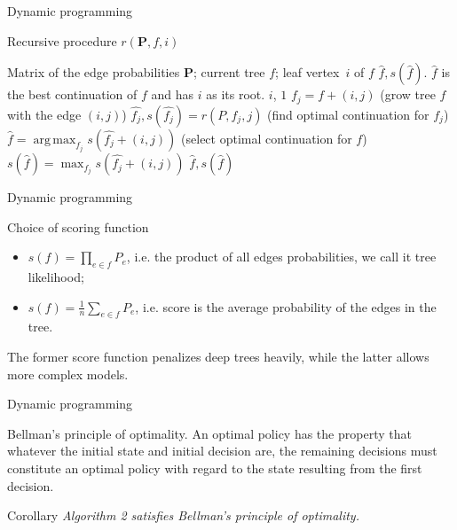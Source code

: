 \documentclass{beamer}
\DeclareMathOperator*{\argmax}{arg\,max}
\begin{document}
\begin{frame}{Dynamic programming}

\begin{algorithm}[H]
	\caption{Recursive procedure $r(\mathbf{P}, f, i)$}
	\label{alg2}
	\begin{algorithmic}
		\REQUIRE Matrix of the edge probabilities $\mathbf{P}$; current tree $f$; leaf vertex~$i$ of $f$
		\ENSURE $\hat{f}, s(\hat{f})$. \enspace $\hat{f}$ is the best continuation of $f$ and has $i$ as its root.
		\RETURN  $i$, $1$
		\ENDIF
		\STATE $f_j = f + (i, j)$ \enspace (grow tree $f$ with the edge $(i, j)$)
		\STATE $\hat{f_j}, s(\hat{f_j}) = r(P, f_j, j)$ \enspace (find optimal continuation for $f_j$)
		\ENDFOR
		\STATE $\hat{f} = \argmax_{f_j} s(\hat{f_j} + (i, j))$ \enspace (select optimal continuation for $f$)
		\STATE $s(\hat{f}) = \max_{f_j} s(\hat{f_j} + (i, j))$
		\RETURN $\hat{f}, s(\hat{f})$
	\end{algorithmic}
\end{algorithm}
\end{frame}

\begin{frame}{Dynamic programming}
\begin{block}{Choice of scoring function}
	\begin{itemize}
		\item $s(f) = \prod\limits_{e \in f} P_{e}$, i.e. the product of all edges probabilities, we call it tree likelihood;
		\item $s(f) = \frac{1}{n}\sum\limits_{e \in f} P_{e}$, i.e. score is the average probability of the edges in the tree.
	\end{itemize}
	The former score function penalizes deep trees heavily, while the latter allows more complex models.
\end{block}
\end{frame}

\begin{frame}{Dynamic programming}
\begin{block}{Bellman's principle of optimality.}
	An optimal policy has the property that whatever the initial state and initial decision are, the remaining decisions must constitute an optimal policy with regard to the state resulting from the first decision.
\end{block}

\begin{block}{Corollary}
\textit{Algorithm 2 satisfies Bellman's principle of optimality.}\\
%
\end{block}
\end{frame}
\end{document}
